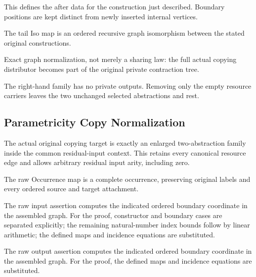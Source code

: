 This defines the after data for the construction just described. Boundary positions are kept distinct from newly inserted internal vertices.
\par{}

The tail Iso map is an ordered recursive graph isomorphism between the stated original constructions.
\par{}

Exact graph normalization, not merely a sharing law: the full actual copying distributor becomes part of the original private contraction tree.
\par{}

The right-hand family has no private outputs. Removing only the empty resource carriers leaves the two unchanged selected abstractions and rest.
\par{}

\subsection{Parametricity Copy Normalization}
The actual original copying target is exactly an enlarged two-abstraction family inside the common residual-input context. This retains every canonical resource edge and allows arbitrary residual input arity, including zero.

The raw Occurrence map is a complete occurrence, preserving original labels and every ordered source and target attachment.
\par{}

The raw input assertion computes the indicated ordered boundary coordinate in the assembled graph.
For the proof, constructor and boundary cases are separated explicitly; the remaining natural-number index bounds follow by linear arithmetic; the defined maps and incidence equations are substituted.
\par{}

The raw output assertion computes the indicated ordered boundary coordinate in the assembled graph.
For the proof, the defined maps and incidence equations are substituted.
\par{}


